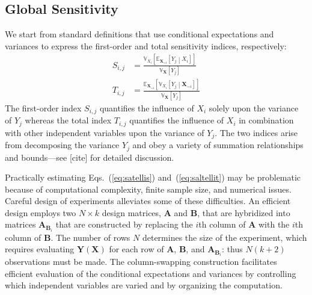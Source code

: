 \documentclass[12pt]{article}
\begin{document}
\subsection{Global Sensitivity}

We start from standard definitions \cite{saltelli_variance_2010} that use conditional expectations and variances to express the first-order and total sensitivity indices, respectively:
\begin{align}
    S_{i,j} & = \frac{\mathbb{V}_{X_i} \left[ \mathbb{E}_{\mathbf{X}_{\sim i}} \left[ Y_j \middle| X_i \right] \right]}{\mathbb{V}_\mathbf{X} \left[ Y_j \right]} \label{eq:satellis}
    \\
    T_{i,j} & = \frac{\mathbb{E}_{\mathbf{X}_{\sim i}} \left[ \mathbb{V}_{X_i} \left[ Y_j \middle| \mathbf{X}_{\sim i} \right] \right]}{\mathbb{V}_\mathbf{X} \left[ Y_j \right]} \label{eq:saltellit}
\end{align}
The first-order index $S_{i,j}$ quantifies the influence of $X_i$ solely upon the variance of $Y_j$ whereas the total index $T_{i,j}$ quantifies the influence of $X_i$ in combination with other independent variables upon the variance of $Y_j$. The two indices arise from decomposing the variance $Y_j$ and obey a variety of summation relationships and bounds---see [cite] for detailed discussion.

Practically estimating Eqs.~(\ref{eq:satellis}) and~(\ref{eq:saltellit}) may be problematic because of computational complexity, finite sample size, and numerical issues. Careful design of experiments alleviates some of these difficulties. An efficient design employs two $N \times k$ design matrices, $\mathbf{A}$ and $\mathbf{B}$, that are hybridized into matrices $\mathbf{A}_{\mathbf{B}_i}$ that are constructed by replacing the $i$th column of $\mathbf{A}$ with the $i$th column of $\mathbf{B}$. The number of rows $N$ determines the size of the experiment, which requires evaluating $\mathbf{Y}\left(\mathbf{X}\right)$ for each row of $\mathbf{A}$, $\mathbf{B}$, and $\mathbf{A}_{\mathbf{B}_i}$: thus $N (k + 2)$ observations must be made. The column-swapping construction facilitates efficient evaluation of the conditional expectations and variances by controlling which independent variables are varied and by organizing the computation.
\end{document}
